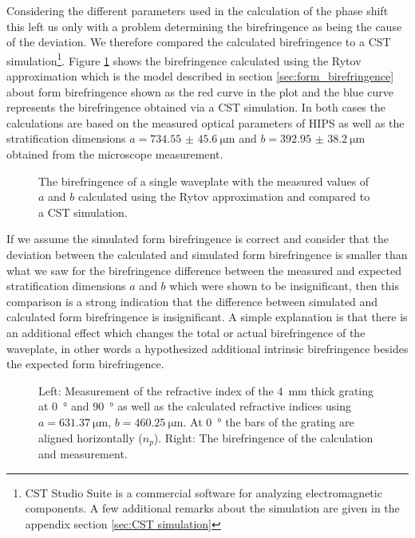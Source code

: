 Considering the different parameters used in the calculation of the phase shift this left us only with a problem determining the birefringence as being the cause of the deviation. We therefore compared the calculated birefringence to a CST simulation\footnote{CST Studio Suite is a commercial software for analyzing electromagnetic components. A few additional remarks about the simulation are given in the appendix section \ref{sec:CST simulation}}. Figure \ref{fig:CSTvsFormBF} shows the birefringence calculated using the Rytov approximation which is the model described in section \ref{sec:form_birefringence} about form birefringence shown as the red curve in the plot and the blue curve represents the birefringence obtained via a CST simulation. In both cases the calculations are based on the measured optical parameters of HIPS as well as the stratification dimensions $a=\SI[separate-uncertainty = true]{734.55(4560)}{\micro \meter}$ and $b=\SI[separate-uncertainty = true]{392.95(3820)}{\micro \meter}$ obtained from the microscope measurement.

\begin{figure}[H]
    \centering
    
    \caption{The birefringence of a single waveplate with the measured values of $a$ and $b$ calculated using the Rytov approximation and compared to a CST simulation.}
    \label{fig:CSTvsFormBF}
\end{figure}

If we assume the simulated form birefringence is correct and consider that the deviation between the calculated and simulated form birefringence is smaller than what we saw for the birefringence difference between the measured and expected stratification dimensions $a$ and $b$ which were shown to be insignificant, then this comparison is a strong indication that the difference between simulated and calculated form birefringence is insignificant. A simple explanation is that there is an additional effect which changes the total or actual birefringence of the waveplate, in other words a hypothesized additional intrinsic birefringence besides the expected form birefringence. 

\begin{figure}[H]
    \centering
    
    \caption{Left: Measurement of the refractive index of the \SI{4}{\milli \meter} thick grating at \SI{0}{\degree} and \SI{90}{\degree} as well as the calculated refractive indices using $a=\SI{631.37}{\micro \meter}$, $b=\SI{460.25}{\micro\meter}$. At \SI{0}{\degree} the bars of the grating are aligned horizontally ($n_p$). Right: The birefringence of the calculation and measurement.}
    \label{fig:ri_slim_grating}
\end{figure}

